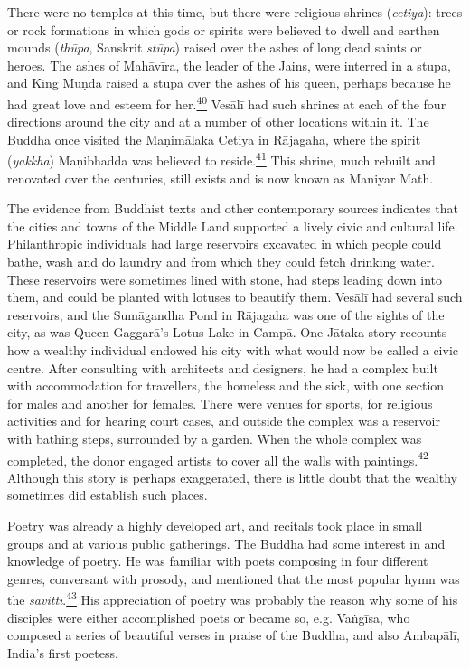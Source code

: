 There were no temples at this time, but there were religious shrines
(\emph{cetiya}): trees or rock formations in which gods or spirits were
believed to dwell and earthen mounds (\emph{thūpa}, Sanskrit
\emph{stūpa}) raised over the ashes of long dead saints or heroes. The
ashes of Mahāvīra, the leader of the Jains, were interred in a stupa,
and King Muṇda raised a stupa over the ashes of his queen, perhaps
because he had great love and esteem for
her.\label{footprints_split_006.html_fnref40}\hyperref[footprints_split_024.htmlux5cux23fn40]{\textsuperscript{40}}
Vesālī had such shrines at each of the four directions around the city
and at a number of other locations within it. The Buddha once visited
the Maṇimālaka Cetiya in Rājagaha, where the spirit (\emph{yakkha})
Maṇibhadda was believed to
reside.\label{footprints_split_006.html_fnref41}\hyperref[footprints_split_024.htmlux5cux23fn41]{\textsuperscript{41}}
This shrine, much rebuilt and renovated over the centuries, still exists
and is now known as Maniyar Math.

The evidence from Buddhist texts and other contemporary sources
indicates that the cities and towns of the Middle Land supported a
lively civic and cultural life. Philanthropic individuals had large
reservoirs excavated in which people could bathe, wash and do laundry
and from which they could fetch drinking water. These reservoirs were
sometimes lined with stone, had steps leading down into them, and could
be planted with lotuses to beautify them. Vesālī had several such
reservoirs, and the Sumāgandha Pond in Rājagaha was one of the sights of
the city, as was Queen Gaggarā's Lotus Lake in Campā. One Jātaka story
recounts how a wealthy individual endowed his city with what would now
be called a civic centre. After consulting with architects and
designers, he had a complex built with accommodation for travellers, the
homeless and the sick, with one section for males and another for
females. There were venues for sports, for religious activities and for
hearing court cases, and outside the complex was a reservoir with
bathing steps, surrounded by a garden. When the whole complex was
completed, the donor engaged artists to cover all the walls with
paintings.\label{footprints_split_006.html_fnref42}\hyperref[footprints_split_024.htmlux5cux23fn42]{\textsuperscript{42}}
Although this story is perhaps exaggerated, there is little doubt that
the wealthy sometimes did establish such places.

Poetry was already a highly developed art, and recitals took place in
small groups and at various public gatherings. The Buddha had some
interest in and knowledge of poetry. He was familiar with poets
composing in four different genres, conversant with prosody, and
mentioned that the most popular hymn was the
\emph{sāvittī}.\label{footprints_split_006.html_fnref43}\hyperref[footprints_split_024.htmlux5cux23fn43]{\textsuperscript{43}}
His appreciation of poetry was probably the reason why some of his
disciples were either accomplished poets or became so, e.g. Vaṅgīsa, who
composed a series of beautiful verses in praise of the Buddha, and also
Ambapālī, India's first poetess.

